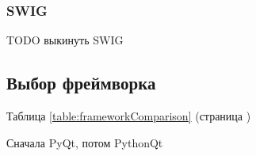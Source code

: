 \documentclass[14pt]{matmex-diploma-custom}
\begin{document}
\subsubsection{SWIG}
TODO выкинуть SWIG

\subsection{Выбор фреймворка}

Таблица \ref{table:frameworkComparison} (страница \pageref{table:frameworkComparison})

Сначала PyQt, потом PythonQt

\end{document}
